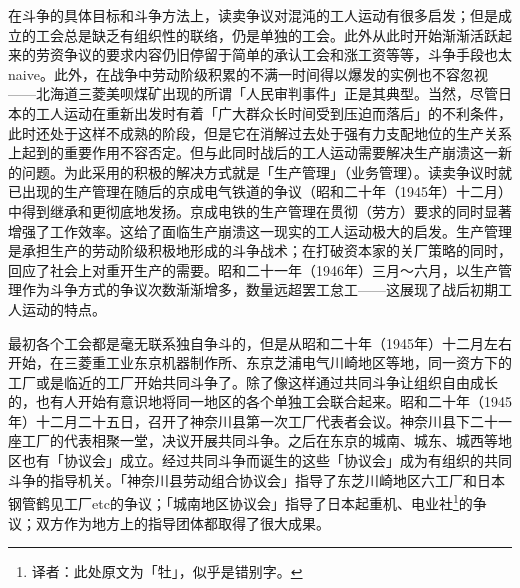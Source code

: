 \documentclass[a4paper,12pt]{article}
\begin{document}
在斗争的具体目标和斗争方法上，读卖争议对混沌的工人运动有很多启发；但是成立的工会总是缺乏有组织性的联络，仍是单独的工会。此外从此时开始渐渐活跃起来的劳资争议的要求内容仍旧停留于简单的承认工会和涨工资等等，斗争手段也太naive。此外，在战争中劳动阶级积累的不满一时间得以爆发的实例也不容忽视——北海道三菱美呗煤矿出现的所谓「人民审判事件」正是其典型。当然，尽管日本的工人运动在重新出发时有着「广大群众长时间受到压迫而落后」的不利条件，此时还处于这样不成熟的阶段，但是它在消解过去处于强有力支配地位的生产关系上起到的重要作用不容否定。但与此同时战后的工人运动需要解决生产崩溃这一新的问题。为此采用的积极的解决方式就是「生产管理」（业务管理）。读卖争议时就已出现的生产管理在随后的京成电气铁道的争议（昭和二十年（1945年）十二月）中得到继承和更彻底地发扬。京成电铁的生产管理在贯彻（劳方）要求的同时显著增强了工作效率。这给了面临生产崩溃这一现实的工人运动极大的启发。生产管理是承担生产的劳动阶级积极地形成的斗争战术；在打破资本家的关厂策略的同时，回应了社会上对重开生产的需要。昭和二十一年（1946年）三月～六月，以生产管理作为斗争方式的争议次数渐渐增多，数量远超罢工怠工——这展现了战后初期工人运动的特点。

最初各个工会都是毫无联系独自争斗的，但是从昭和二十年（1945年）十二月左右开始，在三菱重工业东京机器制作所、东京芝浦电气川崎地区等地，同一资方下的工厂或是临近的工厂开始共同斗争了。除了像这样通过共同斗争让组织自由成长的，也有人开始有意识地将同一地区的各个单独工会联合起来。昭和二十年（1945年）十二月二十五日，召开了神奈川县第一次工厂代表者会议。神奈川县下二十一座工厂的代表相聚一堂，决议开展共同斗争。之后在东京的城南、城东、城西等地区也有「协议会」成立。经过共同斗争而诞生的这些「协议会」成为有组织的共同斗争的指导机关。「神奈川县劳动组合协议会」指导了东芝川崎地区六工厂和日本钢管鹤见工厂etc的争议；「城南地区协议会」指导了日本起重机、电业社\footnote{译者：此处原文为「牡」，似乎是错别字。}的争议；双方作为地方上的指导团体都取得了很大成果。
\end{document}

